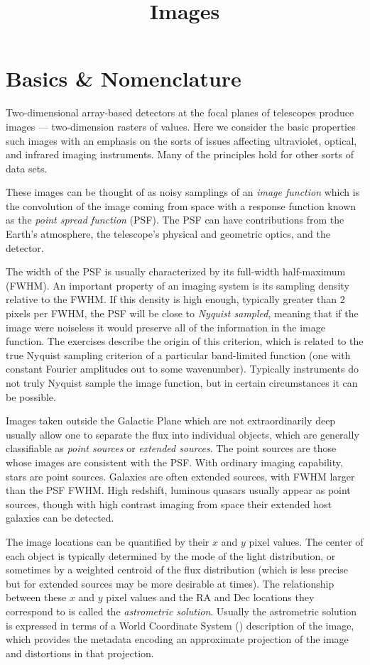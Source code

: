 \title{\bf Images}

\section{Basics \& Nomenclature}

Two-dimensional array-based detectors at the focal planes of
telescopes produce images --- two-dimension rasters of values.  Here
we consider the basic properties such images with an emphasis on the
sorts of issues affecting ultraviolet, optical, and infrared imaging
instruments. Many of the principles hold for other sorts of data sets.

These images can be thought of as noisy samplings of an {\it image
function} which is the convolution of the image coming from space with
a response function known as the {\it point spread function}
(PSF). The PSF can have contributions from the Earth's atmosphere, the
telescope's physical and geometric optics, and the detector.

The width of the PSF is usually characterized by its full-width
half-maximum (FWHM). An important property of an imaging system is its
sampling density relative to the FWHM. If this density is high enough,
typically greater than 2 pixels per FWHM, the PSF will be close to
{\it Nyquist sampled}, meaning that if the image were noiseless it
would preserve all of the information in the image function. The
exercises describe the origin of this criterion, which is related to
the true Nyquist sampling criterion of a particular band-limited
function (one with constant Fourier amplitudes out to some
wavenumber). Typically instruments do not truly Nyquist sample the
image function, but in certain circumstances it can be possible.

Images taken outside the Galactic Plane which are not extraordinarily
deep usually allow one to separate the flux into individual objects,
which are generally classifiable as {\it point sources} or {\it
extended sources}. The point sources are those whose images are
consistent with the PSF. With ordinary imaging capability, stars are
point sources. Galaxies are often extended sources, with FWHM larger
than the PSF FWHM. High redshift, luminous quasars usually appear as
point sources, though with high contrast imaging from space their
extended host galaxies can be detected.

The image locations can be quantified by their $x$ and $y$ pixel
values. The center of each object is typically determined by the mode
of the light distribution, or sometimes by a weighted centroid of the
flux distribution (which is less precise but for extended sources may
be more desirable at times). The relationship between these $x$ and
$y$ pixel values and the RA and Dec locations they correspond to is
called the {\it astrometric solution}. Usually the astrometric
solution is expressed in terms of a World Coordinate System
(\citealt{greisen02a}) description of the image, which provides the
metadata encoding an approximate projection of the image and
distortions in that projection.


